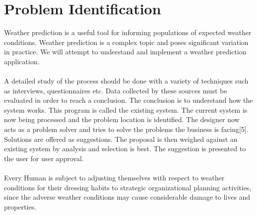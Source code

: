 \section{Problem Identification}
 Weather prediction is a useful tool for informing populations of expected weather conditions. Weather prediction is a complex topic and poses significant variation in practice. We will attempt to understand and implement a weather prediction application.
\\
\\
A detailed study of the process should be done with a variety of  techniques  such  as  interviews,  questionnaires  etc.  Data collected by these sources must be evaluated in order to reach a conclusion. The conclusion is to understand how the system works. This program is called the existing system. The current system  is now  being processed  and the problem  location is identified. The designer now acts as a problem solver and tries to solve the problems the business is facing[5]. Solutions are offered as suggestions. The proposal is then weighed against an existing system  by analysis  and  selection  is best.  The  suggestion is presented to the user for user approval.
\\
\\
Every  Human is subject  to  adjusting  themselves  with  respect  to  weather  conditions  for  their dressing habits to  strategic organizational  planning  activities,  since the  adverse weather conditions may cause considerable damage to lives and properties. 
\\
\\
\\
\\
\\
\\
\\
\\
\\
\\

